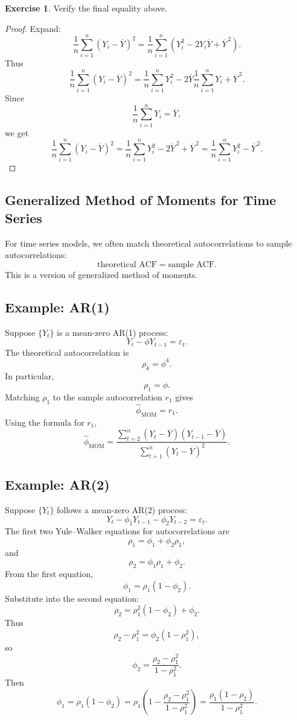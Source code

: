 \documentclass[12pt,oneside]{book}
\numberwithin{equation}{section}
\theoremstyle{definition}
\newtheorem{exercise}{Exercise}[section]
\theoremstyle{plain}
\theoremstyle{remark}
\begin{document}
\begin{exercise}
Verify the final equality above.
\end{exercise}

\begin{proof}
Expand:
\[
\frac{1}{n}\sum_{i=1}^n(Y_i-\overline{Y})^2
=
\frac{1}{n}\sum_{i=1}^n(Y_i^2-2Y_i\overline{Y}+\overline{Y}^{\,2}).
\]
Thus
\[
\frac{1}{n}\sum_{i=1}^n(Y_i-\overline{Y})^2
=
\frac{1}{n}\sum_{i=1}^nY_i^2
-
2\overline{Y}\frac{1}{n}\sum_{i=1}^nY_i
+
\overline{Y}^{\,2}.
\]
Since
\[
\frac{1}{n}\sum_{i=1}^nY_i=\overline{Y},
\]
we get
\[
\frac{1}{n}\sum_{i=1}^n(Y_i-\overline{Y})^2
=
\frac{1}{n}\sum_{i=1}^nY_i^2
-
2\overline{Y}^{\,2}
+
\overline{Y}^{\,2}
=
\frac{1}{n}\sum_{i=1}^nY_i^2-\overline{Y}^{\,2}.
\]
\end{proof}

\subsection{Generalized Method of Moments for Time Series}

For time series models, we often match theoretical autocorrelations to sample autocorrelations:
\[
\text{theoretical ACF}
=
\text{sample ACF}.
\]
This is a version of generalized method of moments.

\subsection*{Example: AR(1)}

Suppose $\{Y_t\}$ is a mean-zero AR(1) process:
\[
Y_t-\phi Y_{t-1}=\varepsilon_t.
\]
The theoretical autocorrelation is
\[
\rho_k=\phi^k.
\]
In particular,
\[
\rho_1=\phi.
\]
Matching $\rho_1$ to the sample autocorrelation $r_1$ gives
\[
\widehat{\phi}_{\mathrm{MOM}}=r_1.
\]
Using the formula for $r_1$,
\[
\widehat{\phi}_{\mathrm{MOM}}
=
\frac{\sum_{t=2}^n(Y_t-\overline{Y})(Y_{t-1}-\overline{Y})}
{\sum_{t=1}^n(Y_t-\overline{Y})^2}.
\]

\subsection*{Example: AR(2)}

Suppose $\{Y_t\}$ follows a mean-zero AR(2) process:
\[
Y_t-\phi_1Y_{t-1}-\phi_2Y_{t-2}=\varepsilon_t.
\]
The first two Yule--Walker equations for autocorrelations are
\[
\rho_1=\phi_1+\phi_2\rho_1,
\]
and
\[
\rho_2=\phi_1\rho_1+\phi_2.
\]
From the first equation,
\[
\phi_1=\rho_1(1-\phi_2).
\]
Substitute into the second equation:
\[
\rho_2=\rho_1^2(1-\phi_2)+\phi_2.
\]
Thus
\[
\rho_2-\rho_1^2
=
\phi_2(1-\rho_1^2),
\]
so
\[
\phi_2
=
\frac{\rho_2-\rho_1^2}{1-\rho_1^2}.
\]
Then
\[
\phi_1
=
\rho_1(1-\phi_2)
=
\rho_1
\left(
1-\frac{\rho_2-\rho_1^2}{1-\rho_1^2}
\right)
=
\frac{\rho_1(1-\rho_2)}{1-\rho_1^2}.
\]
\end{document}
